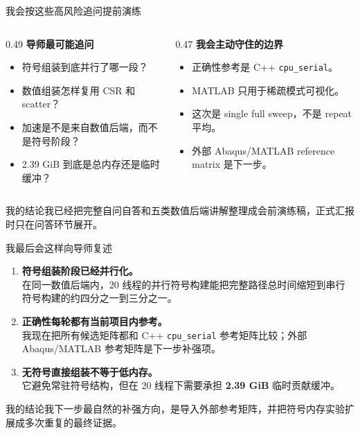 \documentclass[UTF8,aspectratio=169,10pt]{ctexbeamer}
\newcommand{\term}[1]{\textcolor{pgsaBlue}{\textbf{#1}}}
\newcommand{\warn}[1]{\textcolor{pgsaOrange}{\textbf{#1}}}
\newcommand{\code}[1]{\texttt{#1}}
\newcommand{\sourcecn}[1]{\vspace{0.2em}{\scriptsize\textcolor{pgsaGray}{数据来源：#1}}}
\newcommand{\mytake}[1]{\begin{block}{我的结论}#1\end{block}}
\begin{document}
\begin{frame}{我会按这些高风险追问提前演练}
\begin{columns}[T,onlytextwidth]
\begin{column}{0.49\textwidth}
\textbf{导师最可能追问}
\begin{itemize}
  \item 符号组装到底并行了哪一段？
  \item 数值组装怎样复用 CSR 和 scatter？
  \item 加速是不是来自数值后端，而不是符号阶段？
  \item 2.39 GiB 到底是总内存还是临时缓冲？
\end{itemize}
\end{column}
\begin{column}{0.47\textwidth}
\textbf{我会主动守住的边界}
\begin{itemize}
  \item 正确性参考是 C++ \code{cpu\_serial}。
  \item MATLAB 只用于稀疏模式可视化。
  \item 这次是 single full sweep，不是 repeat 平均。
  \item 外部 Abaqus/MATLAB reference matrix 是下一步。
\end{itemize}
\end{column}
\end{columns}
\mytake{我已经把完整自问自答和五类数值后端讲解整理成会前演练稿，正式汇报时只在问答环节展开。}
\sourcecn{mentor\_qna\_rehearsal.md; numeric\_assembly\_algorithm\_rehearsal.md}
\end{frame}

\begin{frame}{我最后会这样向导师复述}
\begin{enumerate}
  \item \term{符号组装阶段已经并行化。}\\
  在同一数值后端内，20 线程的并行符号构建能把完整路径总时间缩短到串行符号构建的约四分之一到三分之一。
  \item \term{正确性每轮都有当前项目内参考。}\\
  我现在把所有候选矩阵都和 C++ \code{cpu\_serial} 参考矩阵比较；外部 Abaqus/MATLAB 参考矩阵是下一步补强项。
  \item \term{无符号直接组装不等于低内存。}\\
  它避免常驻符号结构，但在 20 线程下需要承担 \warn{2.39 GiB} 临时贡献缓冲。
\end{enumerate}
\mytake{我下一步最自然的补强方向，是导入外部参考矩阵，并把符号内存实验扩展成多次重复的最终证据。}
\end{frame}
\end{document}
